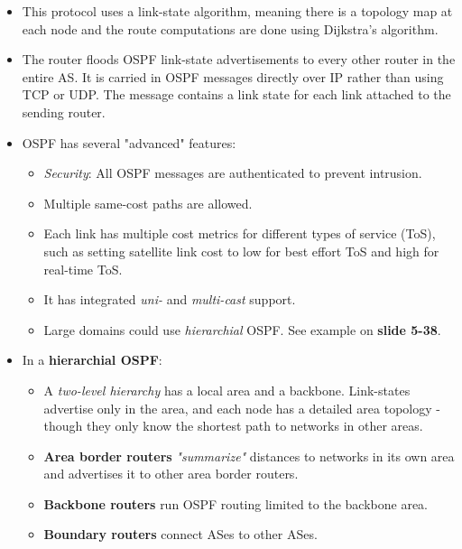 \documentclass{article}
\begin{document}
\begin{itemize}
\item This protocol uses a link-state algorithm, meaning there is a topology map at each node and the route computations are done using Dijkstra's algorithm.
\item The router floods OSPF link-state advertisements to every other router in the entire AS. It is carried in OSPF messages directly over IP rather than using TCP or UDP. The message contains a link state for each link attached to the sending router.
\item OSPF has several "advanced" features:
\begin{itemize}
\item \emph{Security}: All OSPF messages are authenticated to prevent intrusion.
\item Multiple same-cost paths are allowed.
\item Each link has multiple cost metrics for different types of service (ToS), such as setting satellite link cost to low for best effort ToS and high for real-time ToS.
\item It has integrated \emph{uni-} and \emph{multi-cast} support.
\item Large domains could use \emph{hierarchial} OSPF. See example on {\bf slide 5-38}.
\end{itemize}
\item In a {\bf hierarchial OSPF}:
\begin{itemize}
\item A \emph{two-level hierarchy} has a local area and a backbone. Link-states advertise only in the area, and each node has a detailed area topology - though they only know the shortest path to networks in other areas.
\item {\bf Area border routers} \emph{"summarize"} distances to networks in its own area and advertises it to other area border routers.
\item {\bf Backbone routers} run OSPF routing limited to the backbone area.
\item {\bf Boundary routers} connect ASes to other ASes.
\end{itemize}
\end{itemize}
\end{document}
